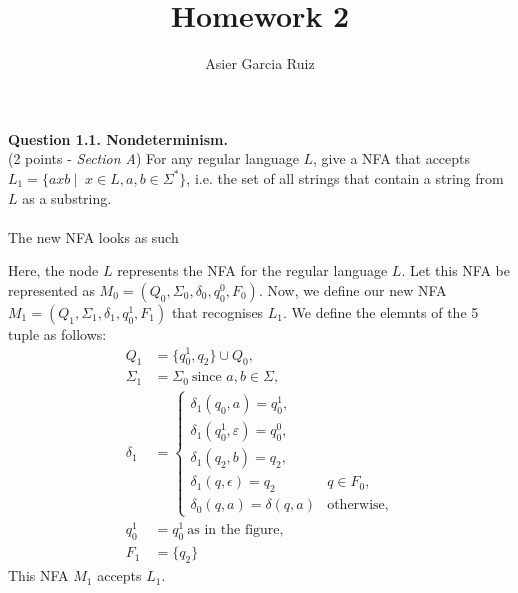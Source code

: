 \documentclass{article}
\title{Homework 2}
\author{Asier Garcia Ruiz}
\newenvironment{question}[2]
{
    {\large \textbf{Question #1.}}\\
    #2\\\\
}{\newpage}
\begin{document}
\maketitle

\begin{question}{1.1. Nondeterminism}
    {
        (2 points - \textit{Section A}) For any regular language $L$, give a NFA that
        accepts $L_1 = \{axb ~|~$ $x \in L, a, b \in \Sigma^*\}$, i.e. the set of all
        strings that contain a string from $L$ as a substring.
    }
    The new NFA looks as such


    Here, the node $L$ represents the NFA for the regular language $L$. Let this NFA be
    represented as $M_0 = (Q_0, \Sigma_0, \delta_0, q_0^0, F_0)$. Now, we define our new NFA
    $M_1 = (Q_1, \Sigma_1, \delta_1, q_0^1, F_1)$ that recognises $L_1$. We define the
    elemnts of the 5 tuple as follows:
    \begin{align*}
        Q_1      & = \{q_0^1, q_2\} \cup Q_0,                          \\
        \Sigma_1 & = \Sigma_0 \ \text{since $a,b \in \Sigma$},         \\
        \delta_1 & = \begin{cases}
                         \delta_1(q_0, a) = q_0^1,                         \\
                         \delta_1(q_0^1, \varepsilon) = q_0^0,             \\
                         \delta_1(q_2, b) = q_2,                           \\
                         \delta_1(q, \epsilon) = q_2   & q \in F_0,        \\
                         \delta_0(q, a) = \delta(q, a) & \text{otherwise,}
                     \end{cases} \\
        q_0^1    & = q_0^1 \ \text{as in the figure},                  \\
        F_1      & = \{q_2\}
    \end{align*}
    This NFA $M_1$ accepts $L_1$.
\end{question}
\end{document}
